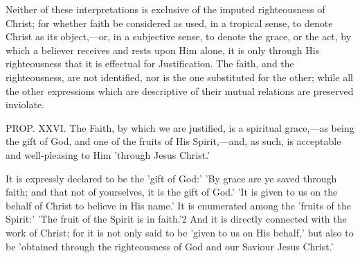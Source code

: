 \documentclass[
]{book}
\begin{document}
Neither of these interpretations is exclusive of the imputed righteousness of Christ; for whether faith be considered as used, in a tropical sense, to denote Christ as its object,---or, in a subjective sense, to denote the grace, or the act, by which a believer receives and rests upon Him alone, it is only through His righteousness that it is effectual for Justification. The faith, and the righteousness, are not identified, nor is the one substituted for the other; while all the other expressions which are descriptive of their mutual relations are preserved inviolate.

PROP. XXVI. The Faith, by which we are justified, is a spiritual grace,---as being the gift of God, and one of the fruits of His Spirit,---and, as such, is acceptable and well-pleasing to Him 'through Jesus Christ.'

It is expressly declared to be the 'gift of God:' 'By grace are ye saved through faith; and that not of yourselves, it is the gift of God.' 'It is given to us on the behalf of Christ to believe in His name.' It is enumerated among the 'fruits of the Spirit:' 'The fruit of the Spirit is in faith.'2 And it is directly connected with the work of Christ; for it is not only said to be 'given to us on His behalf,' but also to be 'obtained through the righteousness of God and our Saviour Jesus Christ.'
\end{document}
